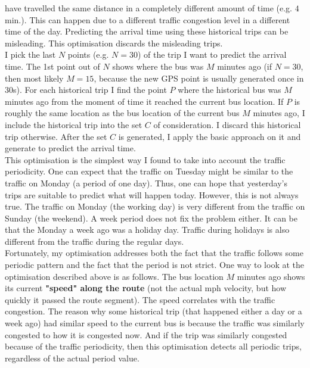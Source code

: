 \documentclass[12pt,a4paper,oneside,openright]{report}
\begin{document}
have travelled the same distance in a completely different amount of 
time (e.g. $4$ min.). This can happen due to a different traffic congestion level
in a different time of the day. Predicting the arrival time using
these historical trips can be misleading. This optimisation discards the misleading
trips. \\

I pick the last $N$ points (e.g. $N = 30$) of the trip I want to predict the arrival
time. The 1st point out of $N$ shows where the bus was $M$ minutes ago (if $N=30$, then
most likely $M=15$, because the new GPS point is usually generated once in 30s).
For each historical trip I find the point $P$ where the historical bus was $M$ minutes
ago from the moment of time it reached the current bus location. If $P$ is roughly
the same location as the bus location of the current bus $M$ minutes ago, I include
the historical trip into the set $C$ of consideration. I discard this historical trip otherwise.
After the set $C$ is generated, I apply the basic approach on it and generate to predict the
arrival time. \\

This optimisation is the simplest way I found to take into account the traffic
periodicity. One can expect that the traffic on Tuesday might be similar to the
traffic on Monday (a period of one day). Thus, one can hope that yesterday's trips
are suitable to predict what will happen today. However,
this is not always true. The traffic on Monday (the working day) is very different
from the traffic on Sunday (the weekend). A week period does not fix the problem either.
It can be that the Monday a week ago was a holiday day.
Traffic during holidays is also different from the traffic during the regular days. \\

Fortunately, my optimisation addresses both the fact that the traffic follows some
periodic pattern and the fact that the period is not strict. One way to look at
the optimisation described above is as follows. The bus location $M$ minutes ago shows
its current \textbf{"speed" along the route} (not the actual mph velocity, but how
quickly it passed the route segment). The speed correlates with the traffic
congestion. The reason why some historical trip (that happened either a day or a week
ago) had similar speed to the current bus is because the traffic was similarly
congested to how it is congested now. And if the trip was similarly congested because
of the traffic periodicity, then this optimisation detects all periodic trips, regardless
of the actual period value. \\
\end{document}
